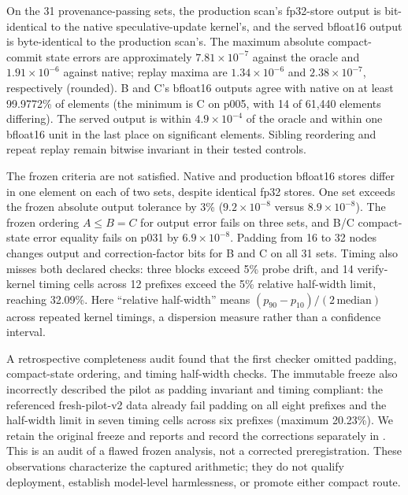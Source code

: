 \documentclass[conference]{IEEEtran}
\begin{document}
On the 31 provenance-passing sets, the production scan's fp32-store output is bit-identical to the native speculative-update kernel's, and the served bfloat16 output is byte-identical to the production scan's. The maximum absolute compact-commit state errors are approximately $7.81\times10^{-7}$ against the oracle and $1.91\times10^{-6}$ against native; replay maxima are $1.34\times10^{-6}$ and $2.38\times10^{-7}$, respectively (rounded). B and C's bfloat16 outputs agree with native on at least 99.9772\% of elements (the minimum is C on p005, with 14 of 61,440 elements differing). The served output is within $4.9\times10^{-4}$ of the oracle and within one bfloat16 unit in the last place on significant elements. Sibling reordering and repeat replay remain bitwise invariant in their tested controls.

The frozen criteria are not satisfied. Native and production bfloat16 stores differ in one element on each of two sets, despite identical fp32 stores. One set exceeds the frozen absolute output tolerance by 3\% ($9.2\times10^{-8}$ versus $8.9\times10^{-8}$). The frozen ordering $A\le B=C$ for output error fails on three sets, and B/C compact-state error equality fails on p031 by $6.9\times10^{-8}$. Padding from 16 to 32 nodes changes output and correction-factor bits for B and C on all 31 sets. Timing also misses both declared checks: three blocks exceed 5\% probe drift, and 14 verify-kernel timing cells across 12 prefixes exceed the 5\% relative half-width limit, reaching 32.09\%. Here ``relative half-width'' means $(p_{90}-p_{10})/(2\,\mathrm{median})$ across repeated kernel timings, a dispersion measure rather than a confidence interval.

A retrospective completeness audit found that the first checker omitted padding, compact-state ordering, and timing half-width checks. The immutable freeze also incorrectly described the pilot as padding invariant and timing compliant: the referenced fresh-pilot-v2 data already fail padding on all eight prefixes and the half-width limit in seven timing cells across six prefixes (maximum 20.23\%). We retain the original freeze and reports and record the corrections separately in . This is an audit of a flawed frozen analysis, not a corrected preregistration. These observations characterize the captured arithmetic; they do not qualify deployment, establish model-level harmlessness, or promote either compact route.
\end{document}
